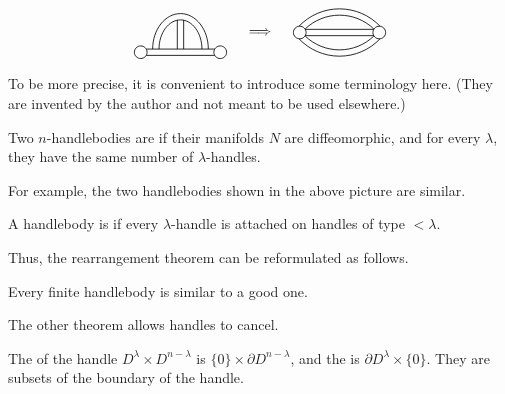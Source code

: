 \[ \begin{tikzpicture}[line width=.6]
    \draw (0,0) circle (.16);
    \draw (2,0) circle (.16);
    \draw (.14,.08) -- (1.86,.08) (.14,-.08) -- (1.86,-.08);
    \draw (.3,.08) arc (180 : 0 : .7 and .9);
    \draw (.46,.08) arc (180 : 0 : .54 and .74);
    \draw (.92,.08) -- (.92,.82) (1.08,.08) -- (1.08,.82);

    \node at (3,.5) {\text{$\Longrightarrow$}};

    \draw (4,.5) circle (.16);
    \draw (6,.5) circle (.16);
    \draw (4.14,.58) -- (5.86,.58) (4.14,.42) -- (5.86,.42);
    \draw (5,1.1) arc (90 : 137 : 1.4);
    \draw (5,1.1) arc (90 : 43 : 1.4);
    \draw (5,.94) arc (90 : 134 : 1.24);
    \draw (5,.94) arc (90 : 46 : 1.24);
    \draw (5,-.1) arc (-90 : -137 : 1.4);
    \draw (5,-.1) arc (-90 : -43 : 1.4);
    \draw (5,.06) arc (-90 : -134 : 1.24);
    \draw (5,.06) arc (-90 : -46 : 1.24);
\end{tikzpicture} \]

To be more precise,
it is convenient to introduce some terminology here.
(They are invented by the author and not meant to be used elsewhere.)

\begin{definition}
    Two $n$-handlebodies are 
    if their manifolds $N$ are diffeomorphic, and for every $\lambda$,
    they have the same number of $\lambda$-handles.
\end{definition}

For example, the two handlebodies shown in the above picture are similar.

\begin{definition}
    A handlebody is  if 
    every $\lambda$-handle is attached on handles of type $<\lambda$.
\end{definition}

Thus, the rearrangement theorem can be reformulated as follows.

{
    \def\thetheorem{\ref*{thm-rearrangement}′}
    \begin{theorem}[Rearrangement]
        Every finite handlebody is similar to a good one.
    \end{theorem}
    \addtocounter{theorem}{-1}
}

The other theorem allows handles to cancel.

\begin{definition}
    The  of the handle $D^\lambda \times D^{n-\lambda}$
    is $\{0\}\times \partial D^{n-\lambda}$,
    and the  is $\partial D^\lambda\times\{0\}$.
    They are subsets of the boundary of the handle.
\end{definition}

